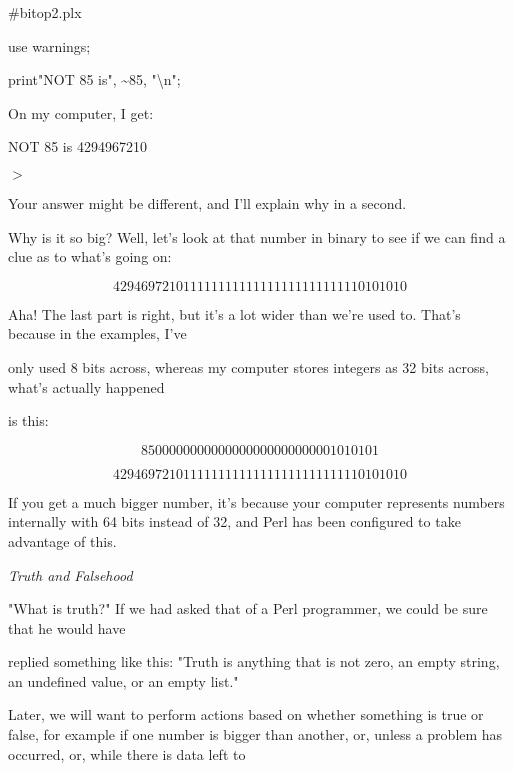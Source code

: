 \documentclass[a4paper,11pt]{book}
\begin{document}
\noindent \#bitop2.plx

\noindent use warnings;

\noindent print"NOT 85 is", \~{}85, "\textbackslash n";

\noindent 

\noindent On my computer, I get:

\noindent 

\noindent NOT 85 is 4294967210

\noindent $>$

\noindent 

\noindent 

\noindent Your answer might be different, and I'll explain why in a second.

\noindent 

\noindent Why is  it so  big? Well,  let's  look  at  that  number  in  binary  to  see if  we  can find  a  clue  as to what's going on:

\noindent 

\[4294697210    11111111111111111111111110101010\] 


\noindent Aha! The last part is right, but it's a lot wider than we're used to. That's because in the examples, I've

\noindent only used 8 bits across, whereas my computer stores integers as 32 bits across, what's actually happened

\noindent is this:

\noindent 

\[85     00000000000000000000000001010101\] 

\[4294697210    11111111111111111111111110101010\] 


\noindent If you get a much bigger number, it's because your computer represents numbers internally with 64 bits instead of 32, and Perl has been configured to take advantage of this.

\noindent 

\noindent \textit{Truth and Falsehood}

\noindent "What is truth?" If we had asked that of a Perl programmer, we could be sure that he would have

\noindent replied something like this: "Truth is anything that is not zero, an empty string, an undefined value, or an empty list."

\noindent 

\noindent Later, we will want to perform actions based on whether something is true or false, for example if one number is bigger than another, or, unless a problem has occurred, or, while there is data left to
\end{document}
